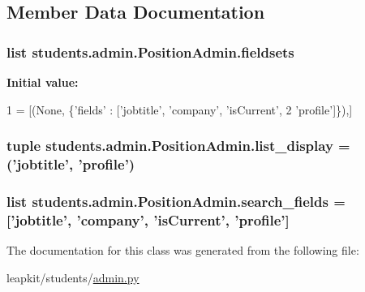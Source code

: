 \subsection{Member Data Documentation}
\hypertarget{classstudents_1_1admin_1_1_position_admin_ae4bf16213a76a16c62a36c5b68b6800b}{
\subsubsection[{fieldsets}]{\setlength{\rightskip}{0pt plus 5cm}list students.\-admin.\-Position\-Admin.\-fieldsets\hspace{0.3cm}{\ttfamily [static]}}}\label{classstudents_1_1admin_1_1_position_admin_ae4bf16213a76a16c62a36c5b68b6800b}
{\bfseries Initial value\-:}
\begin{DoxyCode}
1 = [(\textcolor{keywordtype}{None}, \{\textcolor{stringliteral}{'fields'} : [\textcolor{stringliteral}{'jobtitle'}, \textcolor{stringliteral}{'company'}, \textcolor{stringliteral}{'isCurrent'},
2         \textcolor{stringliteral}{'profile'}]\}),]
\end{DoxyCode}
\hypertarget{classstudents_1_1admin_1_1_position_admin_a2b0a01f8594cfa3438e55d2d61bb3e05}{
\subsubsection[{list\-\_\-display}]{\setlength{\rightskip}{0pt plus 5cm}tuple students.\-admin.\-Position\-Admin.\-list\-\_\-display = ('jobtitle', 'profile')\hspace{0.3cm}{\ttfamily [static]}}}\label{classstudents_1_1admin_1_1_position_admin_a2b0a01f8594cfa3438e55d2d61bb3e05}
\hypertarget{classstudents_1_1admin_1_1_position_admin_ae3055ae3ee6dd5e1b60b35b818f0ad1f}{
\subsubsection[{search\-\_\-fields}]{\setlength{\rightskip}{0pt plus 5cm}list students.\-admin.\-Position\-Admin.\-search\-\_\-fields = \mbox{[}'jobtitle', 'company', 'is\-Current', 'profile'\mbox{]}\hspace{0.3cm}{\ttfamily [static]}}}\label{classstudents_1_1admin_1_1_position_admin_ae3055ae3ee6dd5e1b60b35b818f0ad1f}


The documentation for this class was generated from the following file\-:\begin{DoxyCompactItemize}
\item 
leapkit/students/\hyperlink{admin_8py}{admin.\-py}\end{DoxyCompactItemize}
